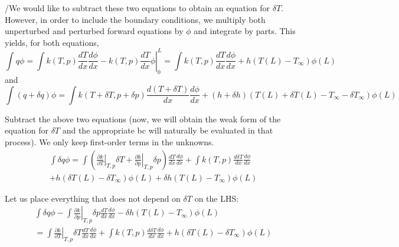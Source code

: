 \documentclass[11pt]{article}
\begin{document}
/We would like to subtract these two equations to obtain an equation for $\delta T$. However, in order to include the boundary conditions, we multiply both unperturbed and perturbed forward equations by $\phi$ and integrate by parts. This yields, for both equations,
\begin{equation}
\int q\phi = \int k(T,p)\frac{dT}{dx}\frac{d\phi}{dx} - \left.k(T,p)\frac{dT}{dx}\phi\right|_0^L  
= \int k(T,p)\frac{dT}{dx}\frac{d\phi}{dx} +h(T(L)-T_\infty) \phi(L) 
\end{equation}
and
\begin{equation}
\int (q+\delta q)\phi = \int k(T+\delta T,p+\delta p)\frac{d(T+\delta T)}{dx}\frac{d\phi}{dx} +(h+\delta h)(T(L)+\delta T(L)-T_\infty-\delta T_\infty) \phi(L) 
\end{equation}

Subtract the above two equations (now, we will obtain the weak form of the equation for $\delta T$ and the appropriate bc will naturally be evaluated in that process). We only keep first-order terms in the unknowns.
\begin{multline}
\int \delta q\phi = \int \left(\left.\frac{\partial k}{\partial T}\right|_{T,p}\delta T+\left.\frac{\partial k}{\partial p}\right|_{T,p}\delta p\right) \frac{dT}{dx}\frac{d\phi}{dx} + \int k(T,p)\frac{d\delta T}{dx}\frac{d\phi}{dx} \\
+h(\delta T(L)-\delta T_\infty)  \phi(L)
+\delta h(T(L)-T_\infty)  \phi(L)
\end{multline}

Let us place everything that does not depend on $\delta T$ on the LHS:
\begin{multline}
\label{eq:sensitivity_nonlinear_hc_1}
\int \delta q\phi 
-\int \left.\frac{\partial k}{\partial p}\right|_{T,p}\delta p \frac{dT}{dx}\frac{d\phi}{dx} 
-\delta h(T(L)-T_\infty)  \phi(L)
\\=
\int \left.\frac{\partial k}{\partial T}\right|_{T,p}\delta T \frac{dT}{dx}\frac{d\phi}{dx} 
+ \int k(T,p)\frac{d\delta T}{dx}\frac{d\phi}{dx} 
+h(\delta T(L)-\delta T_\infty)  \phi(L)
\end{multline}
\end{document}
